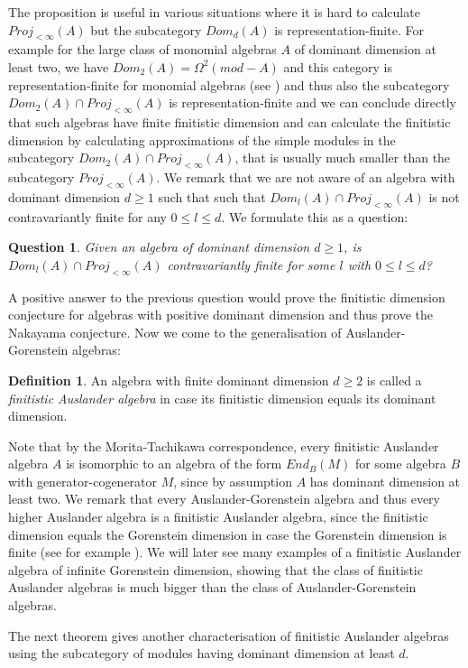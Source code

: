 \documentclass[a4paper]{amsart}
\newtheorem{question}[theorem]{Question}
\theoremstyle{definition}
\newtheorem{definition}[theorem]{Definition}
\theoremstyle{remark}
\numberwithin{equation}{theorem}
\begin{document}
The proposition is useful in various situations where it is hard to calculate $Proj_{<\infty}(A)$ but the subcategory $Dom_d(A)$ is representation-finite.
For example for the large class of monomial algebras $A$ of dominant dimension at least two, we have $Dom_2(A)= \Omega^2(mod-A)$ and this category is representation-finite for monomial algebras (see \cite{Z}) and thus also the subcategory $Dom_2(A) \cap Proj_{<\infty}(A)$ is representation-finite and we can conclude directly that such algebras have finite finitistic dimension and can calculate the finitistic dimension by calculating approximations of the simple modules in the subcategory $Dom_2(A) \cap Proj_{<\infty}(A)$, that is usually much smaller than the subcategory $Proj_{<\infty}(A)$. 
We remark that we are not aware of an algebra with dominant dimension $d \geq 1$ such that such that $Dom_l(A) \cap Proj_{<\infty}(A)$ is not contravariantly finite for any $0 \leq l \leq d$.
We formulate this as a question:
\begin{question}
Given an algebra of dominant dimension $d \geq 1$, is $Dom_l(A) \cap Proj_{<\infty}(A)$ contravariantly finite for some $l$ with $0 \leq l \leq d$?
\end{question}
A positive answer to the previous question would prove the finitistic dimension conjecture for algebras with positive dominant dimension and thus prove the Nakayama conjecture.
Now we come to the generalisation of Auslander-Gorenstein algebras:
\begin{definition}
An algebra with finite dominant dimension $d \geq 2$ is called a \emph{finitistic Auslander algebra} in case its finitistic dimension equals its dominant dimension.
\end{definition}
Note that by the Morita-Tachikawa correspondence, every finitistic Auslander algebra $A$ is isomorphic to an algebra of the form $End_B(M)$ for some algebra $B$ with generator-cogenerator $M$, since by assumption $A$ has dominant dimension at least two.
We remark that every Auslander-Gorenstein algebra and thus every higher Auslander algebra is a finitistic Auslander algebra, since the finitistic dimension equals the Gorenstein dimension in case the Gorenstein dimension is finite (see for example \cite{Che}). We will later see many examples of a finitistic Auslander algebra of infinite Gorenstein dimension, showing that the class of finitistic Auslander algebras is much bigger than the class of Auslander-Gorenstein algebras.

The next theorem gives another characterisation of finitistic Auslander algebras using the subcategory of modules having dominant dimension at least $d$.
\end{document}
